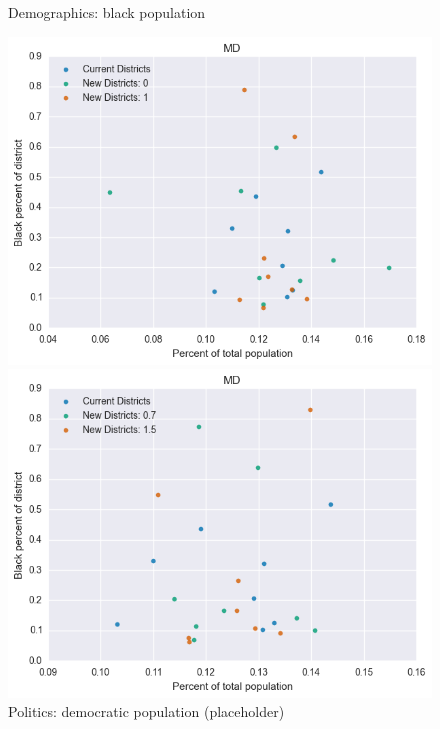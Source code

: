 \begin{figure}[htb!] \centering
\caption{ Demographics: black population }
\includegraphics[width=4.5in]{../analysis/MD/analysis_scatter.png}
\caption{ Politics: democratic population (placeholder)}
\includegraphics[width=4.5in]{../analysis/MD/analysis_scatter2.png}
\end{figure}

\clearpage
\newpage

